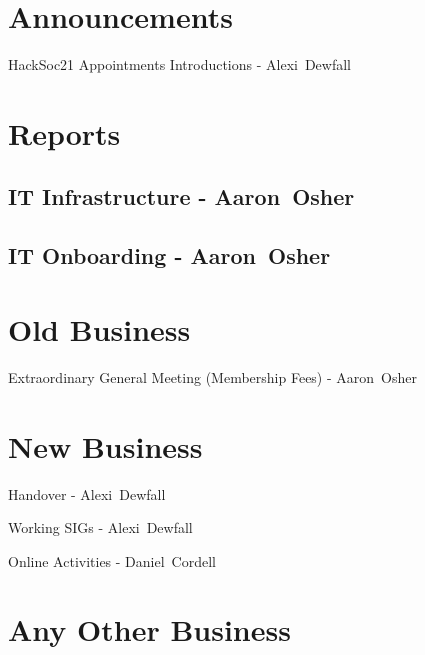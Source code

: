 \documentclass[11pt,hacksoc,agenda]{meetingmins}
\begin{document}
\maketitle

\section{Announcements}
\begin{items}
\item{HackSoc21 Appointments Introductions - Alexi~Dewfall}
\end{items}

\section{Reports}
\subsection{IT Infrastructure - Aaron~Osher}
\begin{hiddensubitems}
\item {}
\end{hiddensubitems}
\subsection{IT Onboarding - Aaron~Osher}
\begin{hiddensubitems}
\item {}
\end{hiddensubitems}

\section{Old Business}
\begin{items}
\item {Extraordinary General Meeting (Membership Fees) - Aaron~Osher} 
\end{items}

\section{New Business}
\begin{items}
\item {Handover - Alexi~Dewfall}
\item {Working SIGs - Alexi~Dewfall}
\item {Online Activities - Daniel~Cordell}
\end{items}

\section{Any Other Business}

\vspace{1em}
\nextmeeting{}
\end{document}
